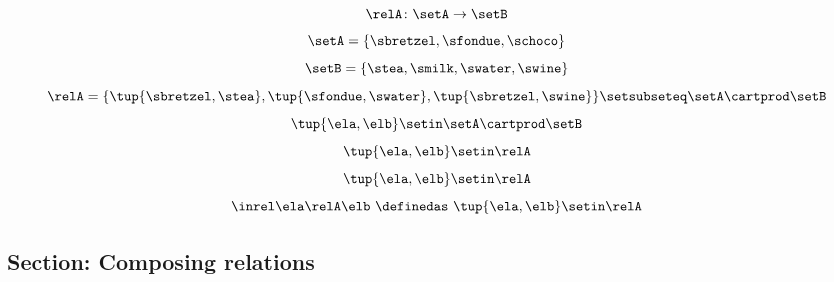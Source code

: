 \begin{forslides}

\begin{equation}\label{slides_session2_76}
\relA \colon \setA \to \setB
\end{equation}
 \begin{equation}\label{slides_session2_77}
\setA = \{ \sbretzel, \sfondue, \schoco \}
\end{equation}
\begin{equation}\label{slides_session2_78}
\setB = \{ \stea, \smilk, \swater, \swine \}
\end{equation}
 \begin{equation}\label{slides_session2_79}
\relA = \{ \tup{\sbretzel, \stea}, \tup{\sfondue, \swater}, \tup{\sbretzel, \swine} \} \setsubseteq \setA \cartprod \setB
\end{equation}
 \begin{equation}\label{slides_session2_80}
\tup{\ela,\elb} \setin \setA \cartprod \setB
\end{equation}
 \begin{equation}\label{slides_session2_81}
\tup{\ela,\elb} \setin \relA
\end{equation}
\begin{equation}\label{slides_session2_82}
\tup{\ela,\elb}\setin \relA
\end{equation}
 \begin{equation}\label{slides_session2_83}
\inrel \ela \relA \elb \ \definedas\  \tup{\ela,\elb}\setin \relA
\end{equation}

\subsection{Section: Composing relations}  


\end{forslides}
